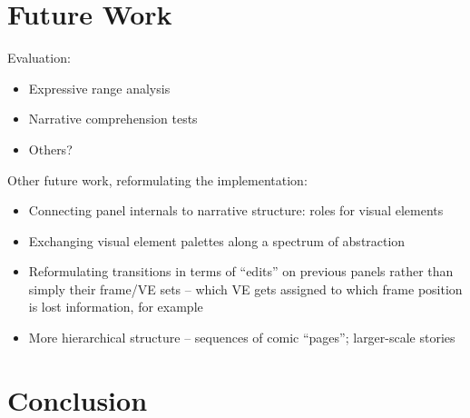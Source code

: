 \section{Future Work}

Evaluation:
\begin{itemize}
\item Expressive range analysis
\item Narrative comprehension tests
\item Others?
\end{itemize}

Other future work, reformulating the implementation:

\begin{itemize}
\item Connecting panel internals to narrative structure: roles for visual
elements
\item Exchanging visual element palettes along a spectrum of abstraction
\item Reformulating transitions in terms of ``edits'' on previous panels
rather than simply their frame/VE sets -- which VE gets assigned to which
frame position is lost information, for example
\item More hierarchical structure -- sequences of comic ``pages'';
larger-scale stories
\end{itemize}


\section{Conclusion}

%
%
